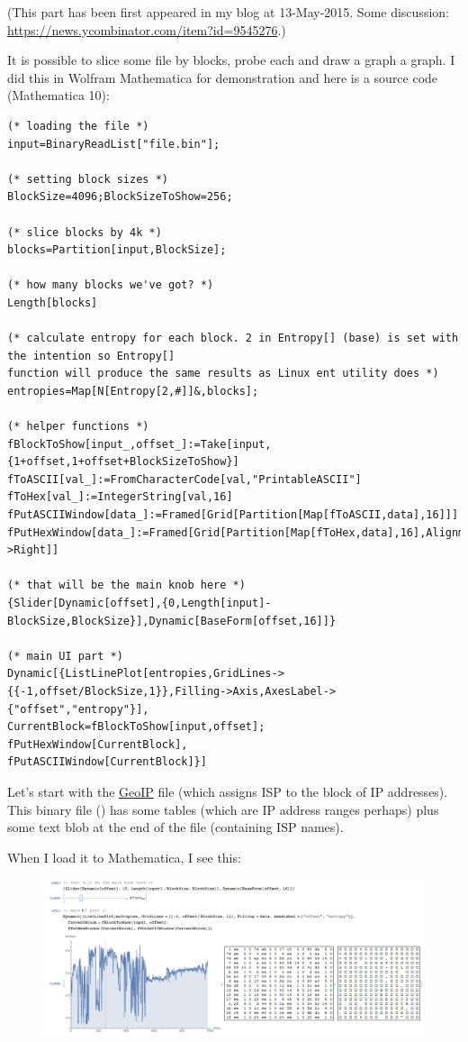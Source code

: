
(This part has been first appeared in my blog at 13-May-2015.
Some discussion: \url{https://news.ycombinator.com/item?id=9545276}.)

It is possible to slice some file by blocks, probe each and draw a graph a graph.
I did this in Wolfram Mathematica for demonstration and here is a source code (Mathematica 10):

\begin{lstlisting}
(* loading the file *)
input=BinaryReadList["file.bin"];

(* setting block sizes *)
BlockSize=4096;BlockSizeToShow=256;

(* slice blocks by 4k *)
blocks=Partition[input,BlockSize];

(* how many blocks we've got? *)
Length[blocks]

(* calculate entropy for each block. 2 in Entropy[] (base) is set with the intention so Entropy[] 
function will produce the same results as Linux ent utility does *)
entropies=Map[N[Entropy[2,#]]&,blocks];

(* helper functions *)
fBlockToShow[input_,offset_]:=Take[input,{1+offset,1+offset+BlockSizeToShow}]
fToASCII[val_]:=FromCharacterCode[val,"PrintableASCII"]
fToHex[val_]:=IntegerString[val,16]
fPutASCIIWindow[data_]:=Framed[Grid[Partition[Map[fToASCII,data],16]]]
fPutHexWindow[data_]:=Framed[Grid[Partition[Map[fToHex,data],16],Alignment->Right]]

(* that will be the main knob here *)
{Slider[Dynamic[offset],{0,Length[input]-BlockSize,BlockSize}],Dynamic[BaseForm[offset,16]]}

(* main UI part *)
Dynamic[{ListLinePlot[entropies,GridLines->{{-1,offset/BlockSize,1}},Filling->Axis,AxesLabel->{"offset","entropy"}],
CurrentBlock=fBlockToShow[input,offset];
fPutHexWindow[CurrentBlock],
fPutASCIIWindow[CurrentBlock]}]
\end{lstlisting}


Let's start with the \href{https://www.maxmind.com/en/geoip-demo}{GeoIP} file (which assigns ISP to the block of IP addresses).
This binary file () has some tables (which are IP address ranges perhaps) plus some text blob at the end of the file
(containing ISP names).

When I load it to Mathematica, I see this:

\begin{figure}[H]
\centering
\includegraphics[scale=\FigScale]{ff/entropy/geoipisp1.png}
\end{figure}

